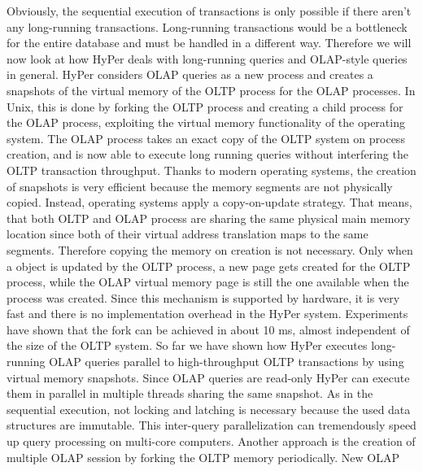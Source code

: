 Obviously, the sequential execution of transactions is only possible if there aren’t any long-running transactions. Long-running transactions would be a bottleneck for the entire database and must be handled in a different way. Therefore we will now look at how HyPer deals with long-running queries and OLAP-style queries in general.
HyPer considers OLAP queries as a new process and creates a snapshots of the virtual memory of the OLTP process for the OLAP processes. In Unix, this is done by forking the OLTP process and creating a child process for the OLAP process, exploiting the virtual memory functionality of the operating system. The OLAP process takes an exact copy of the OLTP system on process creation, and is now able to execute long running queries without interfering the OLTP transaction throughput. Thanks to modern operating systems, the creation of snapshots is very efficient because the memory segments are not physically copied. Instead, operating systems apply a copy-on-update strategy. That means, that both OLTP and OLAP process are sharing the same physical main memory location since both of their virtual address translation maps to the same segments. Therefore copying the memory on creation is not necessary. Only when a object is updated by the OLTP process, a new page gets created for the OLTP process, while the OLAP virtual memory page is still the one available when the process was created. Since this mechanism is supported by hardware, it is very fast and there is no implementation overhead in the HyPer system. Experiments have shown that the fork can be achieved in about 10 ms, almost independent of the size of the OLTP system.
So far we have shown how HyPer executes long-running OLAP queries parallel to high-throughput OLTP transactions by using virtual memory snapshots. Since OLAP queries are read-only HyPer can execute them in parallel in multiple threads sharing the same snapshot. As in the sequential execution, not locking and latching is necessary because the used data structures are immutable. This inter-query parallelization can tremendously speed up query processing on multi-core computers.
Another approach is the creation of multiple OLAP session by forking the OLTP memory periodically. New OLAP


